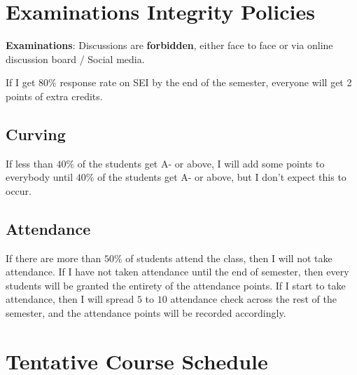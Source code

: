 \documentclass[12pt]{article}
\begin{document}
\section*{Examinations Integrity Policies}

\textbf{Examinations}: Discussions are \textbf{forbidden}, either face to face or via online discussion board / Social media.

If I get $80\%$ response rate on SEI by the end of the semester, everyone will get 2 points of extra credits.

\subsection*{Curving}

If less than $40\%$ of the students get A- or above, I will add some points to everybody until $40\%$ of the students get A- or above, but I don't expect this to occur.

\subsection*{Attendance}
\label{sub:Attendance}

If there are more than $ 50\% $ of students attend the class, then I will not take attendance.
If I have not taken attendance until the end of semester, then every students will be granted the entirety of the attendance points.
If I start to take attendance, then I will spread $ 5 $ to $ 10 $ attendance check across the rest of the semester, and the attendance points will be recorded accordingly.


\section*{Tentative Course Schedule}
\end{document}
